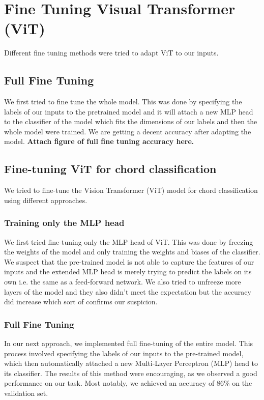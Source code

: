 \documentclass[10pt,twocolumn,letterpaper]{article}
\begin{document}
\section{Fine Tuning Visual Transformer (ViT)}
Different fine tuning methods were tried to adapt ViT to our inputs.
\subsection{Full Fine Tuning}
We first tried to fine tune the whole model. This was done by specifying the labels of our inputs to the pretrained model and it will attach a new MLP head to the classifier of the model which fits the dimensions of our labels and then the whole model were trained. We are getting a decent accuracy after adapting the model. \textbf{Attach figure of full fine tuning accuracy here.}
\subsection{Fine-tuning ViT for chord classification}
We tried to fine-tune the Vision Transformer (ViT) model for chord classification using different approaches.

\subsubsection{Training only the MLP head}
We first tried fine-tuning only the MLP head of ViT. This was done by freezing the weights of the model and only training the weights and biases of the classifier. We suspect that the pre-trained model is not able to capture the features of our inputs and the extended MLP head is merely trying to predict the labels on its own i.e. the same as a feed-forward network. We also tried to unfreeze more layers of the model and they also didn't meet the expectation but the accuracy did increase which sort of confirms our suspicion.

\subsubsection{Full Fine Tuning}
In our next approach, we implemented full fine-tuning of the entire model. This process involved specifying the labels of our inputs to the pre-trained model, which then automatically attached a new Multi-Layer Perceptron (MLP) head to its classifier. The results of this method were encouraging, as we observed a good performance on our task. Most notably, we achieved an accuracy of 86\% on the validation set.
\end{document}
